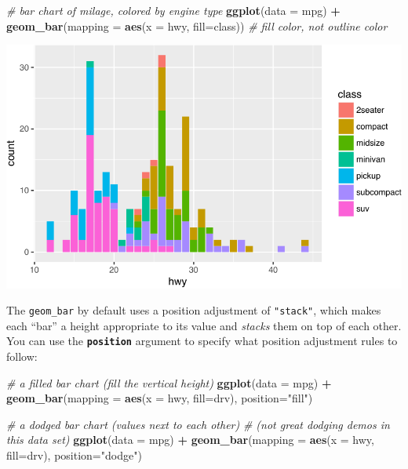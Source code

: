 \documentclass[]{book}
\newenvironment{Shaded}{\begin{snugshade}}{\end{snugshade}}
\newcommand{\KeywordTok}[1]{\textcolor[rgb]{0.13,0.29,0.53}{\textbf{#1}}}
\newcommand{\DataTypeTok}[1]{\textcolor[rgb]{0.13,0.29,0.53}{#1}}
\newcommand{\StringTok}[1]{\textcolor[rgb]{0.31,0.60,0.02}{#1}}
\newcommand{\CommentTok}[1]{\textcolor[rgb]{0.56,0.35,0.01}{\textit{#1}}}
\newcommand{\OperatorTok}[1]{\textcolor[rgb]{0.81,0.36,0.00}{\textbf{#1}}}
\newcommand{\NormalTok}[1]{#1}
\theoremstyle{definition}
\theoremstyle{definition}
\theoremstyle{remark}
\begin{document}
\begin{Shaded}
\begin{Highlighting}[]
\CommentTok{# bar chart of milage, colored by engine type}
\KeywordTok{ggplot}\NormalTok{(}\DataTypeTok{data =}\NormalTok{ mpg) }\OperatorTok{+}
\StringTok{  }\KeywordTok{geom_bar}\NormalTok{(}\DataTypeTok{mapping =} \KeywordTok{aes}\NormalTok{(}\DataTypeTok{x =}\NormalTok{ hwy, }\DataTypeTok{fill=}\NormalTok{class))  }\CommentTok{# fill color, not outline color}
\end{Highlighting}
\end{Shaded}

\includegraphics{img/ggplot2/stacked_bar-1.pdf}

The \texttt{geom\_bar} by default uses a position adjustment of
\texttt{"stack"}, which makes each ``bar'' a height appropriate to its
value and \emph{stacks} them on top of each other. You can use the
\textbf{\texttt{position}} argument to specify what position adjustment
rules to follow:

\begin{Shaded}
\begin{Highlighting}[]
\CommentTok{# a filled bar chart (fill the vertical height)}
\KeywordTok{ggplot}\NormalTok{(}\DataTypeTok{data =}\NormalTok{ mpg) }\OperatorTok{+}
\StringTok{  }\KeywordTok{geom_bar}\NormalTok{(}\DataTypeTok{mapping =} \KeywordTok{aes}\NormalTok{(}\DataTypeTok{x =}\NormalTok{ hwy, }\DataTypeTok{fill=}\NormalTok{drv), }\DataTypeTok{position=}\StringTok{"fill"}\NormalTok{)}

\CommentTok{# a dodged bar chart (values next to each other)}
\CommentTok{# (not great dodging demos in this data set)}
\KeywordTok{ggplot}\NormalTok{(}\DataTypeTok{data =}\NormalTok{ mpg) }\OperatorTok{+}
\StringTok{  }\KeywordTok{geom_bar}\NormalTok{(}\DataTypeTok{mapping =} \KeywordTok{aes}\NormalTok{(}\DataTypeTok{x =}\NormalTok{ hwy, }\DataTypeTok{fill=}\NormalTok{drv), }\DataTypeTok{position=}\StringTok{"dodge"}\NormalTok{)}
\end{Highlighting}
\end{Shaded}
\end{document}
